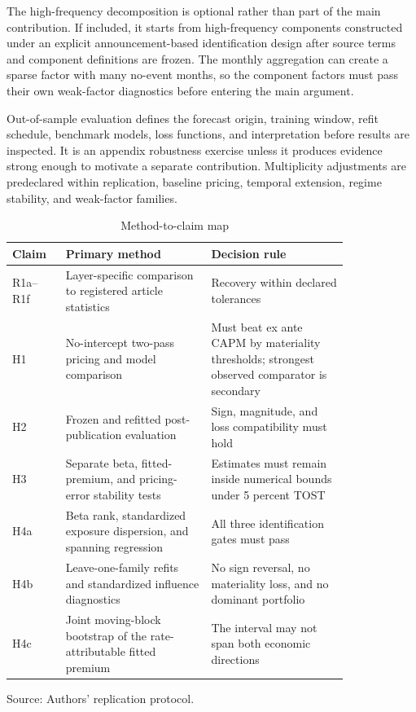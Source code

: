 \documentclass[11pt]{article}
\begin{document}
The high-frequency decomposition is optional rather than part of the main
contribution. If included, it starts from high-frequency components constructed
under an explicit announcement-based identification design after source terms
and component definitions are frozen. The monthly aggregation can create a sparse
factor with many no-event months, so the component factors must pass their own
weak-factor diagnostics before entering the main argument. %

Out-of-sample evaluation defines the forecast origin, training window, refit
schedule, benchmark models, loss functions, and interpretation before results
are inspected. It is an appendix robustness exercise unless it produces evidence
strong enough to motivate a separate contribution. Multiplicity adjustments are
predeclared within replication, baseline pricing, temporal extension, regime
stability, and weak-factor families.

\begin{table}[htbp]
\centering
\caption{Method-to-claim map}
\small
\begin{tabular}{p{0.12\linewidth}p{0.36\linewidth}p{0.34\linewidth}}
\toprule
Claim & Primary method & Decision rule \\
\midrule
R1a--R1f & Layer-specific comparison to registered article statistics & Recovery within declared tolerances \\
H1 & No-intercept two-pass pricing and model comparison & Must beat ex ante CAPM by materiality thresholds; strongest observed comparator is secondary \\
H2 & Frozen and refitted post-publication evaluation & Sign, magnitude, and loss compatibility must hold \\
H3 & Separate beta, fitted-premium, and pricing-error stability tests & Estimates must remain inside numerical bounds under 5 percent TOST \\ %
H4a & Beta rank, standardized exposure dispersion, and spanning regression & All three identification gates must pass \\ %
H4b & Leave-one-family refits and standardized influence diagnostics & No sign reversal, no materiality loss, and no dominant portfolio \\ %
H4c & Joint moving-block bootstrap of the rate-attributable fitted premium & The interval may not span both economic directions \\ %
\bottomrule
\end{tabular}

\smallskip
\small Source: Authors' replication protocol.
\end{table}
\end{document}
